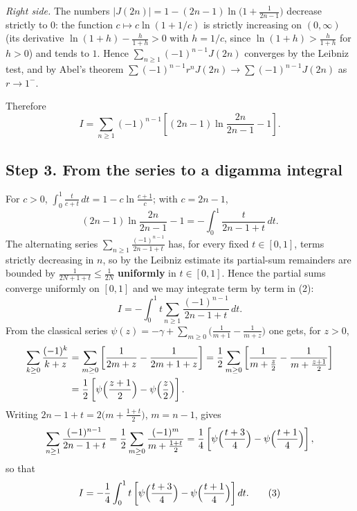\documentclass[11pt]{article}
\theoremstyle{remark}
\begin{document}
\emph{Right side.} The numbers $|J(2n)|=1-(2n-1)\ln\bigl(1+\frac{1}{2n-1}\bigr)$ decrease strictly to $0$: the function $c\mapsto c\ln(1+1/c)$ is strictly increasing on $(0,\infty)$ (its derivative $\ln(1+h)-\frac{h}{1+h}>0$ with $h=1/c$, since $\ln(1+h)>\frac{h}{1+h}$ for $h>0$) and tends to $1$. Hence $\sum_{n\ge1}(-1)^{n-1}J(2n)$ converges by the Leibniz test, and by Abel's theorem $\sum(-1)^{n-1}r^nJ(2n)\to\sum(-1)^{n-1}J(2n)$ as $r\to1^-$.

Therefore
\begin{equation*}
I=\sum_{n\ge1}(-1)^{n-1}\left[(2n-1)\ln\frac{2n}{2n-1}-1\right].
\tag{2}
\end{equation*}

\subsection*{Step 3. From the series to a digamma integral}

For $c>0$, $\displaystyle\int_0^1\frac{t}{c+t}\,dt=1-c\ln\frac{c+1}{c}$; with $c=2n-1$,
$$
(2n-1)\ln\frac{2n}{2n-1}-1=-\int_0^1\frac{t}{2n-1+t}\,dt .
$$
The alternating series $\sum_{n\ge1}\frac{(-1)^{n-1}}{2n-1+t}$ has, for every fixed $t\in[0,1]$, terms strictly decreasing in $n$, so by the Leibniz estimate its partial-sum remainders are bounded by $\frac{1}{2N+1+t}\le\frac1{2N}$ \textbf{uniformly} in $t\in[0,1]$. Hence the partial sums converge uniformly on $[0,1]$ and we may integrate term by term in (2):
$$
I=-\int_0^1 t\sum_{n\ge1}\frac{(-1)^{n-1}}{2n-1+t}\,dt .
$$
From the classical series $\psi(z)=-\gamma+\sum_{m\ge0}\bigl(\frac1{m+1}-\frac1{m+z}\bigr)$ one gets, for $z>0$,
\begin{equation*}
\begin{aligned}
\sum_{k\ge0}\frac{(-1)^{k}}{k+z}
&=\sum_{m\ge0}\left[\frac{1}{2m+z}-\frac{1}{2m+1+z}\right]
=\frac12\sum_{m\ge0}\left[\frac{1}{m+\frac z2}-\frac{1}{m+\frac{z+1}2}\right]\\
&=\frac12\left[\psi\Bigl(\frac{z+1}2\Bigr)-\psi\Bigl(\frac z2\Bigr)\right].
\end{aligned}
\end{equation*}
Writing $2n-1+t=2\bigl(m+\frac{1+t}{2}\bigr)$, $m=n-1$, gives
$$
\sum_{n\ge1}\frac{(-1)^{n-1}}{2n-1+t}
=\frac12\sum_{m\ge0}\frac{(-1)^{m}}{m+\frac{1+t}{2}}
=\frac14\left[\psi\Bigl(\frac{t+3}{4}\Bigr)-\psi\Bigl(\frac{t+1}{4}\Bigr)\right],
$$
so that
\begin{equation*}
I=-\frac14\int_0^1 t\left[\psi\Bigl(\frac{t+3}{4}\Bigr)-\psi\Bigl(\frac{t+1}{4}\Bigr)\right]dt .
\tag{3}
\end{equation*}
\end{document}
